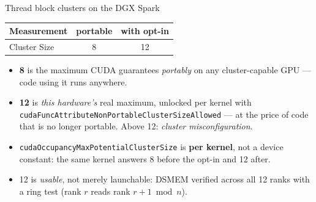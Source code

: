 \documentclass[aspectratio=169, numbering=fraction]{beamer}
\begin{document}
\begin{frame}{Thread block clusters on the DGX Spark}
  \vspace{0.7em}
  \centering
  \small
  \begin{tabular}{lcc}
    \toprule
    \textbf{Measurement}        & \textbf{portable} & \textbf{with opt-in} \\
    \midrule
    Cluster Size       & 8              & 12 \\
    \bottomrule
  \end{tabular}

  \vspace{0.6em}
  \raggedright
  \footnotesize
  \begin{itemize}\itemsep3pt
    \item \textbf{8} is the maximum CUDA guarantees \emph{portably} on any
          cluster-capable GPU --- code using it runs anywhere.
    \item \textbf{12} is \emph{this hardware's} real maximum, unlocked per kernel with
          \texttt{cudaFuncAttributeNonPortableClusterSizeAllowed} --- at the price of
          code that is no longer portable. Above 12: \emph{cluster misconfiguration}.
    \item \texttt{cudaOccupancyMaxPotentialClusterSize} is \textbf{per kernel}, not a
          device constant: the same kernel answers 8 before the opt-in and 12 after.
    \item 12 is \emph{usable}, not merely launchable: DSMEM verified across all 12 ranks
          with a ring test (rank $r$ reads rank $r{+}1 \bmod n$).
  \end{itemize}

\end{frame}
\end{document}
